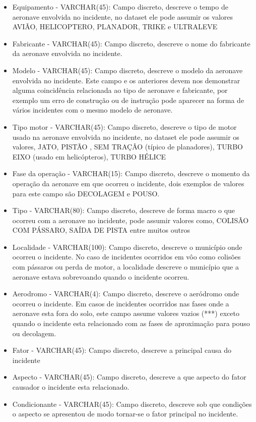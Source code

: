 \documentclass[conference]{IEEEtran}
\begin{document}
\begin{itemize}
 \item Equipamento - VARCHAR(45): Campo discreto, descreve o tempo de aeronave envolvida no incidente, no dataset ele pode assumir os valores AVIÃO, HELICOPTERO, PLANADOR, TRIKE e ULTRALEVE
 \item Fabricante - VARCHAR(45): Campo discreto, descreve o nome do fabricante da aeronave envolvida no incidente. 
 \item Modelo - VARCHAR(45): Campo discreto, descreve o modelo da aeronave envolvida no incidente. Este campo e os anteriores devem nos demonstrar alguma coincidência relacionada
 ao tipo de aeronave e fabricante, por exemplo um erro de construção ou de instrução pode aparecer na forma de vários incidentes com o mesmo modelo de aeronave.
 \item Tipo motor - VARCHAR(45): Campo discreto, descreve o tipo de motor usado na aeronave envolvida no incidente, no dataset ele pode assumir os valores, JATO, PISTÃO
 , SEM TRAÇÂO (típico de planadores), TURBO EIXO (usado em helicópteros), TURBO HÉLICE
 \item Fase da operação - VARCHAR(15): Campo discreto, descreve o momento da operação da aeronave em que ocorreu o incidente, dois exemplos de valores para este campo são
 DECOLAGEM e POUSO.
 \item Tipo - VARCHAR(80): Campo discreto, descreve de forma macro o que ocorreu com a aeronave no incidente, pode assumir valores como, COLISÃO COM PÁSSARO, SAÍDA DE PISTA
 entre muitos outros
 \item Localidade - VARCHAR(100): Campo discreto, descreve o município onde ocorreu o incidente. No caso de incidentes ocorridos em vôo como colisões com pássaros ou perda de
 motor, a localidade descreve o município que a aeronave estava sobrevoando quando o incidente ocorreu.
 \item Aerodromo - VARCHAR(4): Campo discreto, descreve o aeródromo onde ocorreu o incidente. Em casos de incidentes ocorridos nas fases onde a aeronave esta fora do solo,
 este campo assume valores vazios (***) exceto quando o incidente esta relacionado com as fases de aproximação para pouso ou decolagem.
 \item Fator - VARCHAR(45): Campo discreto, descreve a principal causa do incidente
 \item Aspecto - VARCHAR(45): Campo discreto, descreve a que aspecto do fator causador o incidente esta relacionado.
 \item Condicionante - VARCHAR(45): Campo discreto, descreve sob que condições o aspecto se apresentou de modo tornar-se o fator principal no incidente.
\end{itemize}
\end{document}
